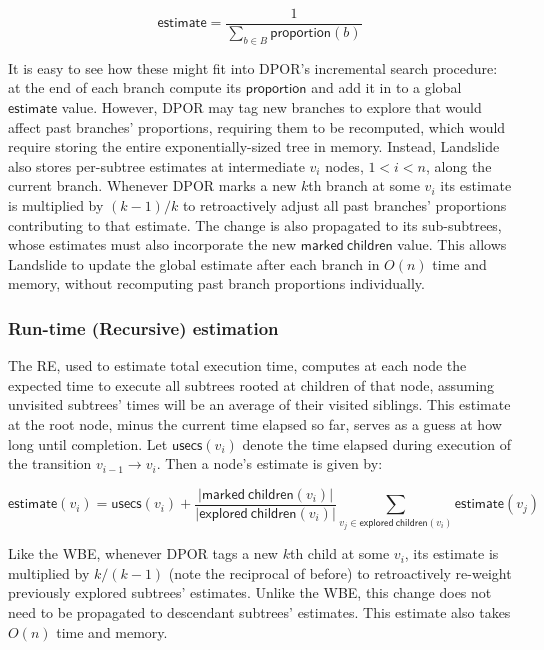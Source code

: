 \[
	\mathsf{estimate} = \frac{1}{\sum_{b \in B} \mathsf{proportion}(b)}
\]

It is easy to see how these might fit into DPOR's incremental search procedure:
at the end of each branch compute its $\mathsf{proportion}$ and add it in to a global $\mathsf{estimate}$ value.
However, DPOR may tag new branches to explore that would affect past branches' proportions,
requiring them to be recomputed,
which would require
storing the entire exponentially-sized tree in memory.
Instead, Landslide also stores per-subtree estimates at intermediate $v_i$ nodes, $1 < i < n$,
along the current branch.
Whenever DPOR marks a new $k$th branch
at some $v_i$
its estimate
is multiplied by $(k-1)/k$ to retroactively adjust all past branches' proportions contributing to that estimate.
The change is also propagated to its sub-subtrees,
whose estimates must also incorporate the new $\mathsf{marked~children}$ value.
This allows Landslide to update the global estimate after each branch in $O(n)$ time and memory,
without recomputing past branch proportions individually.

\subsubsection{Run-time (Recursive) estimation}

The RE, used to estimate total execution time,
computes at each node the expected time to execute all subtrees rooted at children of that node,
assuming unvisited subtrees' times will be an average of their visited siblings.
This estimate at the root node, minus the current time elapsed so far,
serves as a guess at how long until completion.
Let $\mathsf{usecs}(v_i)$ denote the time elapsed during execution of the transition $v_{i-1} \rightarrow v_i$.
Then a node's estimate is given by:

\[
	\mathsf{estimate}(v_i) = \mathsf{usecs}(v_i) +
	\frac{|\mathsf{marked~children}(v_i)|}{|\mathsf{explored~children}(v_i)|}
	\sum_{v_j \in \mathsf{explored~children}(v_i)} \mathsf{estimate}(v_j)
\]

Like the WBE, whenever DPOR tags a new $k$th child at some $v_i$,
its estimate is multiplied by $k/(k-1)$ (note the reciprocal of before)
to retroactively re-weight previously explored subtrees' estimates.
Unlike the WBE, this change does not need to be propagated to descendant subtrees' estimates.
This estimate also takes $O(n)$ time and memory.

